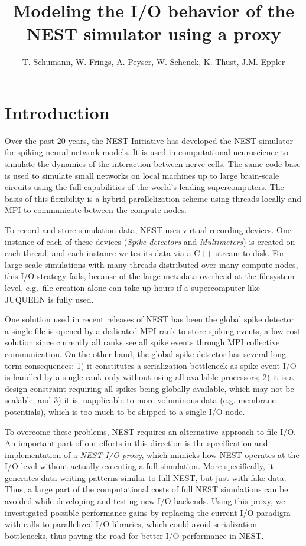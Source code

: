 \documentclass[]{YIC2015}
\title{Modeling the I/O behavior of the NEST simulator using a proxy}
\author[T. Schumann et al.]{%
  T. Schumann\authref{a}\corref,
  W. Frings\authref{b},
  A. Peyser\authref{c},
  W. Schenck\authref{c},
  K. Thust\authref{b},
  J.M. Eppler\authref{c}
}
\begin{document}
\maketitle

\section{Introduction}
%
Over the past 20 years, the NEST Initiative \cite{NESTInitiative} has
developed the NEST simulator \cite{NEST} for spiking neural network
models. It is used in computational neuroscience to simulate the
dynamics of the interaction between nerve cells. The same code base is
used to simulate small networks on local machines up to large
brain-scale circuits using the full capabilities of the world's
leading supercomputers. The basis of this flexibility is a hybrid
parallelization scheme using threads locally and MPI to communicate
between the compute nodes.

To record and store simulation data, NEST uses virtual recording
devices. One instance of each of these devices (\emph{Spike detectors}
and \emph{Multimeters}) is created on each thread, and each instance
writes its data via a C++ stream to disk. For large-scale simulations
with many threads distributed over many compute nodes, this I/O
strategy fails, because of the large metadata overhead at the
filesystem level, e.g.~file creation alone can take up hours if a
supercomputer like JUQUEEN is fully used.

One solution used in recent releases of NEST has been the global spike
detector \cite{gsd}: a single file is opened by a dedicated MPI rank to
store spiking events, a low cost solution since currently all ranks
see all spike events through MPI collective communication.
On the other hand, the global spike detector has several long-term
consequences: 1) it constitutes a serialization bottleneck as spike
event I/O is handled by a single rank only without using all available
processors; 2) it is a design constraint requiring all spikes being
globally available, which may not be scalable; and 3) it is
inapplicable to more voluminous data (e.g. membrane potentials), which
is too much to be shipped to a single I/O node.

To overcome these problems, NEST requires an alternative approach to
file I/O. An important part of our efforts in this direction is the
specification and implementation of a \emph{NEST I/O proxy}, which
mimicks how NEST operates at the I/O level without actually executing
a full simulation. More specifically, it generates data writing
patterns similar to full NEST, but just with fake data. Thus, a large
part of the computational costs of full NEST simulations can be
avoided while developing and testing new I/O backends. Using this
proxy, we investigated possible performance gains by replacing the
current I/O paradigm with calls to parallelized I/O libraries, which
could avoid serialization bottlenecks, thus paving the road for better
I/O performance in NEST.
\end{document}
